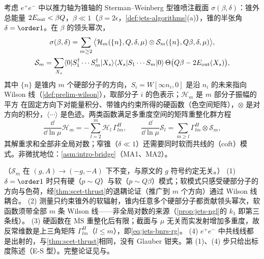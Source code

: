\begin{theorem}\label{thm:jets-ngl-factorization}
考虑 $e^+e^-$ 中以推力轴为锥轴的 Sterman--Weinberg 型锥喷注截面 $\sigma(\beta,\delta)$：锥外总能量 $2E_{\rm out}<\beta Q$，$\beta\ll1$（$\beta=2\epsilon$，\cref{def:jets-algorithms}(a)），锥的半张角 $\delta=\order1$。在 $\beta$ 的领头幂次，
\begin{equation}\label{eq:jets-bnrs}
\begin{gathered}
\sigma(\beta,\delta)=\sum_{m\ge2}\big\langle\mathcal H_m(\{n\},Q,\delta,\mu)\otimes\mathcal S_m(\{n\},Q\beta,\delta,\mu)\big\rangle,\\
\mathcal S_m=\sum_{X_s}\langle0|S_1^\dagger\cdots S_m^\dagger|X_s\rangle\langle X_s|S_1\cdots S_m|0\rangle\,\Theta\big(Q\beta-2E_{\rm out}(X_s)\big),
\end{gathered}
\end{equation}
其中 $\{n\}$ 是锥内 $m$ 个硬部分子的方向，$S_i=W[\infty n_i,0]$ 是沿 $n_i$ 的未来指向 Wilson 线（\cref{def:prelim-wilson}），取部分子 $i$ 的色表示；$\mathcal H_m$ 是 $m$ 部分子振幅的平方
在固定方向下对能量积分、带锥内约束所得的硬函数（色空间矩阵），$\otimes$ 是对方向的积分，$\langle\cdots\rangle$ 是色迹。两类函数满足多重度空间的矩阵重整化群方程
\begin{equation}\label{eq:jets-bnrs-rg}
\frac{\dd}{\dd\ln\mu}\mathcal H_m=-\sum_{l=2}^{m}\mathcal H_l\,\Gamma^H_{lm},\qquad
\frac{\dd}{\dd\ln\mu}\mathcal S_l=\sum_{m\ge l}\Gamma^H_{lm}\otimes\mathcal S_m ,
\end{equation}
其解重求和全部非全局对数；窄锥（$\delta\ll1$）还需要同时软而共线的（coft）模式。非微扰地位：\cref{asm:intro-bridge}（MA1、MA2）。
\end{theorem}

\begin{proofsketch}
（$\mathcal S_m$ 在 $(g,A)\to(-g,-A)$ 下不变，与原文\cite{Becher:2016mmh}的 $g$ 符号约定无关。）
(1) $\delta=\order1$ 时只有硬（$p\sim Q$）与软（$p\sim Q\beta$）模式；软模式只感受硬部分子的方向与色荷，经\cref{thm:scet-thrust}的退耦论证（推广到 $m$ 个方向）通过 Wilson 线耦合。
(2) 测量只约束锥外的软辐射，锥内任意多个硬部分子都贡献领头幂次，软函数须带全部 $m$ 条 Wilson 线——非全局对数的来源（\cref{prop:jets-ngl}的 $k_1$ 即第三条线）。
(3) 硬函数在 $\overline{\mathrm{MS}}$ 重整化后有限；截面与 $\mu$ 无关而实发射增加多重度，故反常维数是上三角矩阵 $\Gamma^H_{lm}$（$l\le m$），即\cref{eq:jets-bnrs-rg}。
(4) $e^+e^-$ 中共线线都是出射的，与\cref{thm:scet-thrust}相同，没有 Glauber 钳夹。第 (1)、(4) 步只给出标度陈述（E-S 型）。完整论证见\cite[第~2~节]{Becher:2016mmh}与\cite{Becher:2015hka}。
\end{proofsketch}

